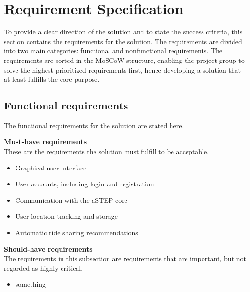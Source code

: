 \section{Requirement Specification}
To provide a clear direction of the solution and to state the success criteria, this section contains the requirements for the solution. The requirements are divided into two main categories: functional and nonfunctional requirements. The requirements are sorted in the MoSCoW structure, enabling the project group to solve the highest prioritized requirements first, hence developing a solution that at least fulfills the core purpose.


\iffalse
\begin{itemize}
	\item Opret brugere, og bestem disposition af bil
	\item Registrere all selv kørte strækninger
	\item Sammenlign med andre med (ca) samme start og sluts position
	\item Udregn strækning mellem sammenligningerne. 
	\item Automatisk forslag om ridesharing mellem pendlere, som tit rejser fra og til samme område på samme tid, hvor tid og penge kunne spares.
	\item Reservation af køre [fra, til, klokkeslet] (normal carpool)
\end{itemize}
\fi


\subsection{Functional requirements}
The functional requirements for the solution are stated here.

\textbf{Must-have requirements}\\
These are the requirements the solution must fulfill to be acceptable.
\begin{itemize}
	\item Graphical user interface
	\item User accounts, including login and registration
	\item Communication with the aSTEP core
	\item User location tracking and storage
	\item Automatic ride sharing recommendations
\end{itemize}

\textbf{Should-have requirements}\\
The requirements in this subsection are requirements that are important, but not regarded as highly critical.
\begin{itemize}
	\item something
\end{itemize}

